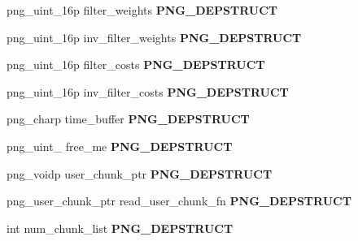\begin{DoxyCompactItemize}
\item 
png\+\_\+uint\+\_\+16p filter\+\_\+weights {\bfseries P\+N\+G\+\_\+\+D\+E\+P\+S\+T\+R\+U\+CT}\hypertarget{structpng__struct__def_ae84f67d113e29cee8cfd50b46dca84da}{}\label{structpng__struct__def_ae84f67d113e29cee8cfd50b46dca84da}

\item 
png\+\_\+uint\+\_\+16p inv\+\_\+filter\+\_\+weights {\bfseries P\+N\+G\+\_\+\+D\+E\+P\+S\+T\+R\+U\+CT}\hypertarget{structpng__struct__def_a1eb1a2b25c203abb05d1287064d48690}{}\label{structpng__struct__def_a1eb1a2b25c203abb05d1287064d48690}

\item 
png\+\_\+uint\+\_\+16p filter\+\_\+costs {\bfseries P\+N\+G\+\_\+\+D\+E\+P\+S\+T\+R\+U\+CT}\hypertarget{structpng__struct__def_a0d125f7841c27b6891e99dc6964856bd}{}\label{structpng__struct__def_a0d125f7841c27b6891e99dc6964856bd}

\item 
png\+\_\+uint\+\_\+16p inv\+\_\+filter\+\_\+costs {\bfseries P\+N\+G\+\_\+\+D\+E\+P\+S\+T\+R\+U\+CT}\hypertarget{structpng__struct__def_a01ed21a156d4390e7cb1d498d1908636}{}\label{structpng__struct__def_a01ed21a156d4390e7cb1d498d1908636}

\item 
png\+\_\+charp time\+\_\+buffer {\bfseries P\+N\+G\+\_\+\+D\+E\+P\+S\+T\+R\+U\+CT}\hypertarget{structpng__struct__def_a445cb624d1d1a88d40a4d352117b5210}{}\label{structpng__struct__def_a445cb624d1d1a88d40a4d352117b5210}

\item 
png\+\_\+uint\+\_ free\+\_\+me {\bfseries P\+N\+G\+\_\+\+D\+E\+P\+S\+T\+R\+U\+CT}\hypertarget{structpng__struct__def_ada97b33695dd3406cd86e152d8a92bb0}{}\label{structpng__struct__def_ada97b33695dd3406cd86e152d8a92bb0}

\item 
png\+\_\+voidp user\+\_\+chunk\+\_\+ptr {\bfseries P\+N\+G\+\_\+\+D\+E\+P\+S\+T\+R\+U\+CT}\hypertarget{structpng__struct__def_a0927a86f66d2969d435ff22bfb41cfb3}{}\label{structpng__struct__def_a0927a86f66d2969d435ff22bfb41cfb3}

\item 
png\+\_\+user\+\_\+chunk\+\_\+ptr read\+\_\+user\+\_\+chunk\+\_\+fn {\bfseries P\+N\+G\+\_\+\+D\+E\+P\+S\+T\+R\+U\+CT}\hypertarget{structpng__struct__def_ae097ba0dfbdd0d8713087c8dd4a43cc0}{}\label{structpng__struct__def_ae097ba0dfbdd0d8713087c8dd4a43cc0}

\item 
int num\+\_\+chunk\+\_\+list {\bfseries P\+N\+G\+\_\+\+D\+E\+P\+S\+T\+R\+U\+CT}\hypertarget{structpng__struct__def_add543e6ab78e61d3e335228465e47228}{}\label{structpng__struct__def_add543e6ab78e61d3e335228465e47228}


\end{DoxyCompactItemize}
